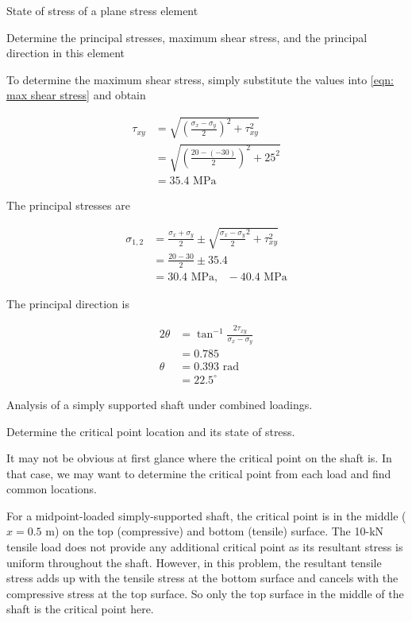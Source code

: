 \documentclass[a4paper,openany,nobib]{tufte-book}
\begin{document}
State of stress of a plane stress element

Determine the principal stresses, maximum shear stress, and the
principal direction in this element


To determine the maximum shear stress, simply substitute the values into
\ref{eqn: max shear stress} and obtain

$$\begin{aligned}
      \tau_{xy} &= \sqrt {\left( \frac{\sigma_x - \sigma_y}{2} \right)^2 + \tau _{xy}^2}  \\ 
      &= \sqrt {\left( \frac{20 - ( - 30)}{2} \right)^2 + 25^2}  \\ 
      &= 35.4\text{ MPa}
    \end{aligned}$$

The principal stresses are

$$\begin{aligned}
      \sigma_{1,2} &= \frac{\sigma_x + \sigma_y}{2} \pm \sqrt {\frac{\sigma_x - \sigma_y}{2}^2 + \tau _{xy}^2}  \\ 
      &= \frac{20 - 30}{2} \pm 35.4 \\ 
      &= 30.4\text{ MPa}, \text{ } - 40.4\text{ MPa}
    \end{aligned}$$

The principal direction is

$$\begin{aligned}
      2\theta & = \tan^{-1}\frac{2\tau_{xy}}{\sigma_x - \sigma_y} \\ 
      &= 0.785 \\ 
      \theta  &= 0.393\text{ rad} \\ 
      &= 22.5^{\circ}
    \end{aligned}$$

Analysis of a simply supported shaft under combined loadings.


Determine the critical point location and its state of stress.

It may not be obvious at first glance where the critical point on the
shaft is. In that case, we may want to determine the critical point from
each load and find common locations.

For a midpoint-loaded simply-supported shaft, the critical point is in
the middle (\(x = 0.5\) m) on the top (compressive) and bottom (tensile)
surface. The 10-kN tensile load does not provide any additional critical
point as its resultant stress is uniform throughout the shaft. However,
in this problem, the resultant tensile stress adds up with the tensile
stress at the bottom surface and cancels with the compressive stress at
the top surface. So only the top surface in the middle of the shaft is
the critical point here.
\end{document}
